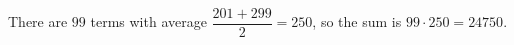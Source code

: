 There are $99$ terms with average $\dfrac{201+299}{2}=250$, so the sum is $99\cdot250=\boxed{24750}$.
